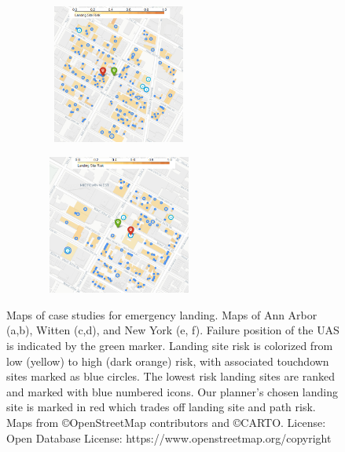 \begin{figure}[!ht]
\begin{subfigure}[b]{0.47\linewidth}
        \caption{\label{fig:ch5_wt_map2}}
      \end{subfigure}
      \begin{subfigure}[b]{0.47\linewidth}
        \centering\includegraphics[clip, width=155pt, height=130pt]{chapter_5_mapping/imgs/newyork_scenario_1.png}
        \caption{\label{fig:ch5_ny_map1}}
      \end{subfigure}
      \begin{subfigure}[b]{0.47\linewidth}
        \centering\includegraphics[width=155pt, height=130pt]{chapter_5_mapping/imgs/newyork_scenario_4.png}
        \caption{\label{fig:ch5_ny_map2}}
      \end{subfigure}
         \caption[Maps of case studies for emergency landing]{Maps of case studies for emergency landing. Maps of Ann Arbor (a,b), Witten (c,d), and New York (e, f).  Failure position of the \ac{UAS} is indicated by the green marker. Landing site risk is colorized from low (yellow) to high (dark orange) risk, with associated touchdown sites marked as blue circles. The lowest risk landing sites are ranked and marked with blue numbered icons. Our planner's chosen landing site is marked in red which trades off landing site and path risk. Maps from \copyright OpenStreetMap contributors and \copyright CARTO. License: Open Database License: https://www.openstreetmap.org/copyright}
     \label{fig:ch5_all_scenarios_map}
\end{figure}

